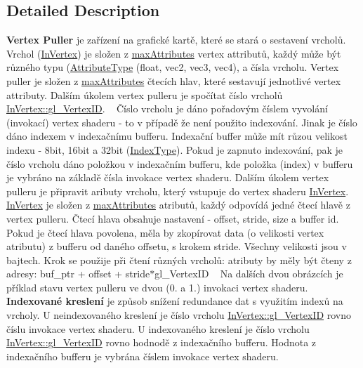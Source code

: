 \subsection{Detailed Description}
{\bfseries Vertex Puller} je zařízení na grafické kartě, které se stará o sestavení vrcholů. Vrchol (\hyperlink{structInVertex}{In\+Vertex}) je složen z \hyperlink{fwd_8hpp_a176b31bcc8f8b93ee7ef0810ea77730b}{max\+Attributes} vertex attributů, každý může být různého typu (\hyperlink{fwd_8hpp_a349a9cde14be8097df865ba0469c0ab2}{Attribute\+Type} (float, vec2, vec3, vec4), a čísla vrcholu. Vertex puller je složen z \hyperlink{fwd_8hpp_a176b31bcc8f8b93ee7ef0810ea77730b}{max\+Attributes} čtecích hlav, které sestavují jednotlivé vertex attributy. Dalším úkolem vertex pulleru je spočítat číslo vrcholů \hyperlink{structInVertex_aa4d31911053492bffe4b41dae12ee000}{In\+Vertex\+::gl\+\_\+\+Vertex\+ID}. ~\newline
 Číslo vrcholu je dáno pořadovým číslem vyvolání (invokací) vertex shaderu -\/ to v případě že není použito indexování. Jinak je číslo dáno indexem v indexačnímu bufferu. Indexační buffer může mít růzou velikost indexu -\/ 8bit, 16bit a 32bit (\hyperlink{fwd_8hpp_a2bfb0a0ff1c379a8b4e8f9d24fdd4839}{Index\+Type}). Pokud je zapnuto indexování, pak je číslo vrcholu dáno položkou v indexačním bufferu, kde položka (index) v bufferu je vybráno na základě čísla invokace vertex shaderu. Dalším úkolem vertex pulleru je připravit aributy vrcholu, který vstupuje do vertex shaderu \hyperlink{structInVertex}{In\+Vertex}. \hyperlink{structInVertex}{In\+Vertex} je složen z \hyperlink{fwd_8hpp_a176b31bcc8f8b93ee7ef0810ea77730b}{max\+Attributes} atributů, každý odpovídá jedné čtecí hlavě z vertex pulleru. Čtecí hlava obsahuje nastavení -\/ offset, stride, size a buffer id. Pokud je čtecí hlava povolena, měla by zkopírovat data (o velikosti vertex atributu) z bufferu od daného offsetu, s krokem stride. Všechny velikosti jsou v bajtech. Krok se použije při čtení různých vrcholů\+: atributy by měly být čteny z adresy\+: buf\+\_\+ptr + offset + stride$\ast$gl\+\_\+\+Vertex\+ID ~\newline
  Na dalších dvou obrázcích je příklad stavu vertex pulleru ve dvou (0. a 1.) invokaci vertex shaderu.  {\bfseries Indexované kreslení} je způsob snížení redundance dat s využitím indexů na vrcholy. U neindexovaného kreslení je číslo vrcholu \hyperlink{structInVertex_aa4d31911053492bffe4b41dae12ee000}{In\+Vertex\+::gl\+\_\+\+Vertex\+ID} rovno číslu invokace vertex shaderu. U indexovaného kreslení je číslo vrcholu \hyperlink{structInVertex_aa4d31911053492bffe4b41dae12ee000}{In\+Vertex\+::gl\+\_\+\+Vertex\+ID} rovno hodnodě z indexačního bufferu. Hodnota z indexačního bufferu je vybrána číslem invokace vertex shaderu.




